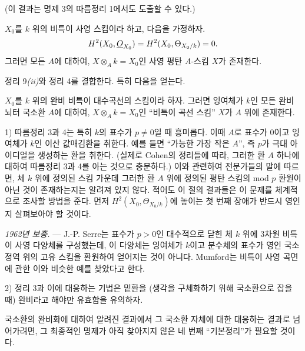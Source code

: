 (이 결과는 명제 3의 따름정리 1에서도 도출할 수 있다.)

 $X_0$를 $k$ 위의 비특이 사영 스킴이라 하고,
다음을 가정하자.
\[
  H^2(X_0,\underline{O}_{X_0})=H^2(X_0,\Theta_{X_0/k})=0.
\]
그러면 모든 $A$에 대하여, $X\otimes_A k=X_0$인 사영
평탄 $A$-스킴 $X$가 존재한다.

정리 9\textit{(ii)}와 정리 4를 결합한다. 특히 다음을 얻는다.

 $X_0$를 $k$ 위의 완비 비특이 대수곡선의
스킴이라 하자. 그러면 잉여체가 $k$인 모든 완비 뇌터 국소환 $A$에 대하여,
$X\otimes_A k=X_0$인 ``비특이 곡선 스킴'' $X$가 $A$ 위에 존재한다.


1) 따름정리 3과 4는 특히 $k$의 표수가
$p\ne0$일 때 흥미롭다. 이때 $A$로 표수가 $0$이고 잉여체가 $k$인
이산 값매김환을 취한다. 예를 들면 ``가능한 가장 작은 $A$'',
즉 $p$가 극대 아이디얼을 생성하는 환을 취한다. (실제로
Cohen의 정리들에 따라, 그러한 환 $A$ 하나에 대하여 따름정리 3과 4를
아는 것으로 충분하다.) 이와 관련하여 전문가들의 말에 따르면,
체 $k$ 위에 정의된 스킴 가운데 그러한 환 $A$ 위에 정의된 평탄 스킴의
mod $p$ 환원이 아닌 것이 존재하는지는 알려져 있지 않다. 적어도 이 절의 결과들은
이 문제를 체계적으로 조사할 방법을 준다. 먼저
$H^2(X_0,\Theta_{X_0/k})$에 놓이는 첫 번째 장애가
반드시 영인지 살펴보아야 할 것이다.

\emph{1962년 보충.} --- J.-P. Serre는 표수가 $p>0$인 대수적으로
닫힌 체 $k$ 위에 3차원 비특이 사영 다양체를 구성했는데, 이 다양체는
잉여체가 $k$이고 분수체의 표수가 영인 국소 정역 위의 고유 스킴을
환원하여 얻어지는 것이 아니다. Mumford는 비특이 사영 곡면에 관한
이와 비슷한 예를 찾았다고 한다.

2) 정리 3과 이에 대응하는 기법은 밑환을 (생각을 구체화하기 위해 국소환으로
잡을 때) 완비라고 해야만 유효함을 유의하자.

국소환의 완비화에 대하여 알려진 결과에서 그 국소환 자체에 대한
대응하는 결과로 넘어가려면, 그 최종적인 명제가 아직 찾아지지 않은
네 번째 ``기본정리''가 필요할 것이다.

